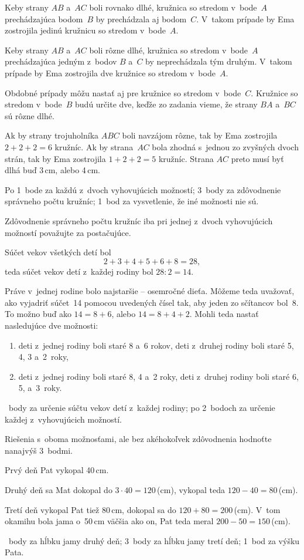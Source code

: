 {%
Keby strany $AB$ a~$AC$ boli rovnako dlhé, kružnica so stredom v~bode~$A$ prechádzajúca bodom~$B$ by prechádzala aj bodom~$C$.
V~takom prípade by Ema zostrojila jedinú kružnicu so stredom v~bode~$A$.

Keby strany $AB$ a~$AC$ boli rôzne dlhé, kružnica so stredom v~bode~$A$ prechádzajúca jedným z~bodov $B$ a~$C$ by neprechádzala tým druhým.
V~takom prípade by Ema zostrojila dve kružnice so stredom v~bode~$A$.

Obdobné prípady môžu nastať aj pre kružnice so stredom v~bode~$C$.
Kružnice so stredom v~bode~$B$ budú určite dve, keďže zo zadania vieme, že strany $BA$ a~$BC$ sú rôzne dlhé.

Ak by strany trojuholníka $ABC$ boli navzájom rôzne, tak by Ema zostrojila $2+2+2=6$ kružníc.
Ak by strana~$AC$ bola zhodná s~jednou zo zvyšných dvoch strán, tak by Ema zostrojila $1+2+2=5$ kružníc.
Strana $AC$ preto musí byť dlhá buď 3\,cm, alebo 4\,cm.
%

\hodnotenie
Po 1~bode za každú z~dvoch vyhovujúcich možností;
3~body za zdôvodnenie správneho počtu kružníc;
1~bod za vysvetlenie, že iné možnosti nie sú.

Zdôvodnenie správneho počtu kružníc iba pri jednej z~dvoch vyhovujúcich možností považujte za postačujúce.
\endhodnotenie
}

{%
Súčet vekov všetkých detí bol
$$
2+3+4+5+6+8=28,
$$
teda súčet vekov detí z~každej rodiny bol $28:2=14$.

Práve v~jednej rodine bolo najstaršie -- osemročné dieťa.
Môžeme teda uvažovať, ako vyjadriť súčet~14 pomocou uvedených čísel tak, aby jeden zo sčítancov bol~8.
To možno buď ako $14=8+6$, alebo $14=8+4+2$.
Mohli teda nastať nasledujúce dve možnosti:
\begin{enumerate}\alphatrue
\item deti z~jednej rodiny boli staré 8 a~6 rokov, deti z~druhej rodiny boli staré 5, 4, 3 a~2~roky,
\item deti z~jednej rodiny boli staré 8, 4 a~2 roky, deti z~druhej rodiny boli staré 6, 5, a~3~roky.
\end{enumerate}

~body za určenie súčtu vekov detí z~každej rodiny;
po 2~bodoch za určenie každej z~vyhovujúcich možností.

Riešenia s~oboma možnosťami, ale bez akéhokoľvek zdôvodnenia hodnoťte nanajvýš 3~bodmi.
\endhodnotenie
}

{%
Prvý deň Pat vykopal 40\,cm.

Druhý deň sa Mat dokopal do $3\cdot 40=120$\,(cm), vykopal teda $120-40=80$\,(cm).

Tretí deň vykopal Pat tiež 80\,cm, dokopal sa do $120+80=200$\,(cm).
V~tom okamihu bola jama o~50\,cm väčšia ako on, Pat teda meral $200-50=150$\,(cm).

~body za hĺbku jamy druhý deň;
3~body za hĺbku jamy tretí deň;
1~bod za výšku Pata.
\endhodnotenie
}


